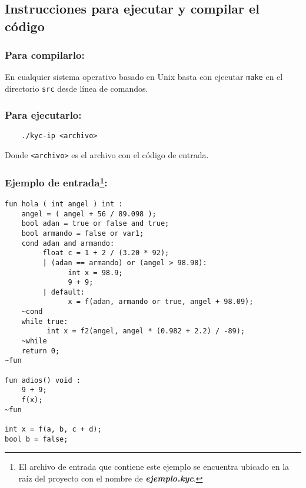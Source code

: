 \documentclass[12pt]{article}
\begin{document}
\subsection*{Instrucciones para ejecutar y compilar el código}

\subsubsection*{Para compilarlo:}

En cualquier sistema operativo basado en Unix basta con ejecutar \texttt{make} en el directorio \texttt{src} desde línea de comandos. 

\subsubsection*{Para ejecutarlo:} 

\begin{verbatim}
    ./kyc-ip <archivo>
\end{verbatim}
Donde \texttt{<archivo>} es el archivo con el código de entrada.

\subsubsection*{Ejemplo de entrada\footnote{El archivo de entrada que contiene este ejemplo se encuentra ubicado en la raíz del proyecto con el nombre de \textbf{\textit{ejemplo.kyc}}. }:}
\begin{verbatim}
fun hola ( int angel ) int : 
    angel = ( angel + 56 / 89.098 );
    bool adan = true or false and true;
    bool armando = false or var1;
    cond adan and armando:
         float c = 1 + 2 / (3.20 * 92);
         | (adan == armando) or (angel > 98.98):
               int x = 98.9;
               9 + 9;
         | default:
               x = f(adan, armando or true, angel + 98.09);            
    ~cond
    while true:
          int x = f2(angel, angel * (0.982 + 2.2) / -89);            
    ~while
    return 0;
~fun

fun adios() void :
    9 + 9;
    f(x);
~fun

int x = f(a, b, c + d);
bool b = false;
\end{verbatim}
\end{document}
